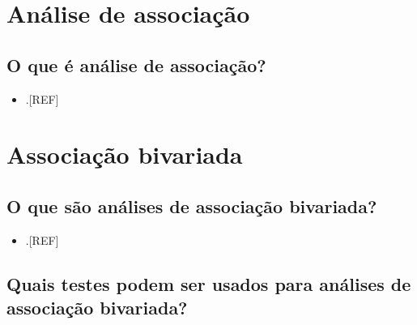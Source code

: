 \documentclass[
  a4paper,
]{book}
\providecommand{\tightlist}{%
  \setlength{\itemsep}{0pt}\setlength{\parskip}{0pt}}
\begin{document}
\hypertarget{anuxe1lise-de-associauxe7uxe3o}{%
\section{Análise de associação}\label{anuxe1lise-de-associauxe7uxe3o}}

\hypertarget{o-que-uxe9-anuxe1lise-de-associauxe7uxe3o}{%
\subsection{O que é análise de associação?}\label{o-que-uxe9-anuxe1lise-de-associauxe7uxe3o}}

\begin{itemize}
\tightlist
\item
  .{[}REF{]}
\end{itemize}

\hypertarget{bivariada}{%
\section{Associação bivariada}\label{bivariada}}

\hypertarget{o-que-suxe3o-anuxe1lises-de-associauxe7uxe3o-bivariada}{%
\subsection{O que são análises de associação bivariada?}\label{o-que-suxe3o-anuxe1lises-de-associauxe7uxe3o-bivariada}}

\begin{itemize}
\tightlist
\item
  .{[}REF{]}
\end{itemize}

\hypertarget{quais-testes-podem-ser-usados-para-anuxe1lises-de-associauxe7uxe3o-bivariada}{%
\subsection{Quais testes podem ser usados para análises de associação bivariada?}\label{quais-testes-podem-ser-usados-para-anuxe1lises-de-associauxe7uxe3o-bivariada}}
\end{document}

